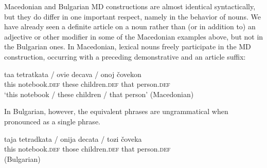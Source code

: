 \documentclass[output=paper,
colorlinks,
citecolor=brown,
newtxmath
]{langscibook}
\begin{document}
\ea \label{yourphonem}
\z\z

\noindent Macedonian and Bulgarian MD constructions are almost identical syntactically, but they do differ in one important respect, namely in the behavior of nouns. We have already seen a definite article on a noun rather than (or in addition to) an adjective or other modifier in some of the Macedonian examples above, but not in the Bulgarian ones. In Macedonian, lexical nouns freely participate in the MD construction, occurring with a preceding demonstrative and an article suffix:


\ea
\gll taa tetratkata / ovie decava / onoj čovekon \\
this notebook.\textsc{def} { } these children.\textsc{def} { } that person.\textsc{def} \\
\glt `this notebook / these children / that person' \hfill(Macedonian)
\z

\begin{sloppypar}
\noindent In Bulgarian, however, the equivalent phrases are ungrammatical when pronounced as a single phrase.
\end{sloppypar}


\ea
\gll \minsp{*} taja tetradkata / \minsp{*} onija decata / \minsp{*} tozi čoveka \\
{} this notebook.\textsc{def} { } {} those children.\textsc{def} { } {} that person.\textsc{def} \\  \hfill(Bulgarian)
\z
\end{document}
